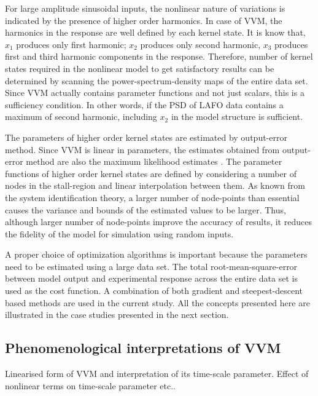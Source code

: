 \documentclass{AIAA}
\begin{document}
For large amplitude sinusoidal inputs, the nonlinear nature of variations is indicated by the presence of higher order harmonics. In case of VVM, the harmonics in the response are well defined by each kernel state. It is know that, $x_1$ produces only first harmonic; $x_2$ produces only second harmonic, $x_3$ produces first and third harmonic  components in the response. Therefore, number of kernel states required in the nonlinear model to get satisfactory results can be determined by scanning the power-spectrum-density maps of the entire data set. Since VVM actually contains parameter functions and not just scalars, this is a sufficiency condition. In other words, if the PSD of LAFO data contains a maximum of second harmonic, including $x_2$ in the model structure is sufficient.

The parameters of higher order kernel states are estimated by output-error method. Since VVM is linear in parameters, the estimates obtained from output-error method are also the maximum likelihood estimates \cite{Morelli}. The parameter functions of higher order kernel states are defined by considering a number of nodes in the stall-region and linear interpolation between them. As known from the system identification theory, a larger number of node-points than essential causes the variance and bounds of the estimated values to be larger. Thus,  although larger number of node-points improve the accuracy of results, it reduces the fidelity of the model for simulation using random inputs.

A proper choice of optimization algorithms is important because the parameters need to be estimated using a large data set. The total root-mean-square-error between model output and experimental response across the entire data set is used as the cost function. A combination of both gradient and steepest-descent based methods are used in the current study. All the concepts presented here are illustrated in the case studies presented in the next section.

\subsection{Phenomenological interpretations of VVM}
Linearised form of VVM and interpretation of its time-scale parameter. Effect of nonlinear terms on time-scale parameter etc..
\end{document}
